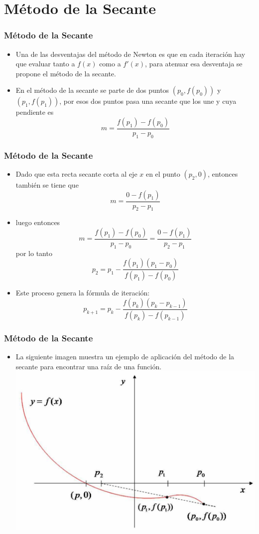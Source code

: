 \documentclass{beamer}
\begin{document}
\section{M\'etodo de la Secante}
\begin{frame}
  \frametitle{M\'etodo de la Secante}
  \begin{itemize}
    \item<1-> Una de las desventajas del m\'etodo de Newton es que en cada iteraci\'on hay que evaluar tanto a $f(x)$ como a $f'(x)$, para
    atenuar esa desventaja se propone el m\'etodo de la secante.
    \item<2-> En el m\'etodo de la secante se parte de dos puntos $(p_0,f(p_0))$ y $(p_1,f(p_1))$, por esos dos
    puntos pasa una secante que los une y cuya pendiente es    
    $$
    m = \frac{f(p_1) - f(p_0)}{p_1 - p_0}
    $$    
  \end{itemize}    
\end{frame}
\begin{frame} 
  \frametitle{M\'etodo de la Secante}
  \begin{itemize}
    \item<1-> Dado que esta recta secante corta al eje $x$ en el punto $(p_2 , 0)$, entonces tambi\'en se tiene que
    $$
    m = \frac{0 - f(p_1)}{p_2 - p_1}
    $$
    \item<2->luego entonces    
    $$
    m = \frac{f(p_1) - f(p_0)}{p_1 - p_0} = \frac{0 - f(p_1)}{p_2 - p_1}
    $$
    por lo tanto    
    $$
    p_2 = p_1 - \frac{f(p_1)(p_1 - p_0)}{f(p_1) - f(p_0)}
    $$
    \item<3->Este proceso genera la f\'ormula de iteraci\'on:    
    $$
    p_{k+1} = p_k - \frac{f(p_k)(p_k - p_{k-1})}{f(p_k) - f(p_{k-1})}
    $$
  \end{itemize}    
\end{frame} 
\begin{frame}
  \frametitle{M\'etodo de la Secante}
  \begin{itemize}
    \item<1-> La siguiente imagen muestra un ejemplo de aplicaci\'on del m\'etodo de la secante para encontrar una ra\'iz de una funci\'on.
    \centering
\includegraphics[scale=0.35]{sec1.eps}
  \end{itemize}    
\end{frame}
\end{document}
